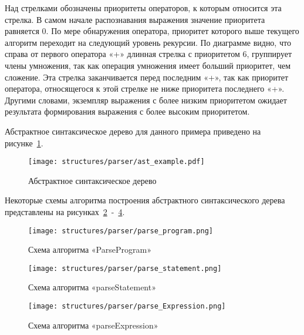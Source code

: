 Над стрелками обозначены приоритеты операторов, к которым относится эта стрелка.
В самом начале распознавания выражения значение приоритета равняется 0.
По мере обнаружения оператора, приоритет которого выше текущего алгоритм переходит на следующий уровень рекурсии.
По диаграмме видно, что справа от первого оператора «+» длинная стрелка с приоритетом 6, группирует члены умножения, так как операция умножения имеет больший приоритет, чем сложение.
Эта стрелка заканчивается перед последним «+», так как приоритет оператора, относящегося к этой стрелке не ниже приоритета последнего «+».
Другими словами, экземпляр выражения с более низким приоритетом ожидает результата формирования выражения с более высоким приоритетом.

Абстрактное синтаксическое дерево для данного примера приведено на рисунке~\ref{f:ast_example}.

\begin{figure}[ht]
	\centering
	\vspace{\toppaddingoffigure}
	\texttt{[image: structures/parser/ast\_example.pdf]}
	\caption{Абстрактное синтаксическое дерево}
	\label{f:ast_example}
\end{figure}

Некоторые схемы алгоритма построения абстрактного синтаксического дерева представлены на рисунках~\ref{f:parse_program}~-~\ref{f:parse_Expression}.


\clearpage

\begin{figure}[!htp]
	\centering
	\texttt{[image: structures/parser/parse\_program.png]}
	\caption{Схема алгоритма «ParseProgram»}
	\label{f:parse_program}
\end{figure}

\clearpage

\begin{figure}[!htp]
	\centering
	\texttt{[image: structures/parser/parse\_statement.png]}
	\caption{Схема алгоритма «parseStatement»}
	\label{f:parse_statement}
\end{figure}

\clearpage

\begin{figure}[!htp]
	\centering
	\texttt{[image: structures/parser/parse\_Expression.png]}
	\caption{Схема алгоритма «parseExpression»}
	\label{f:parse_Expression}
\end{figure}

\clearpage

